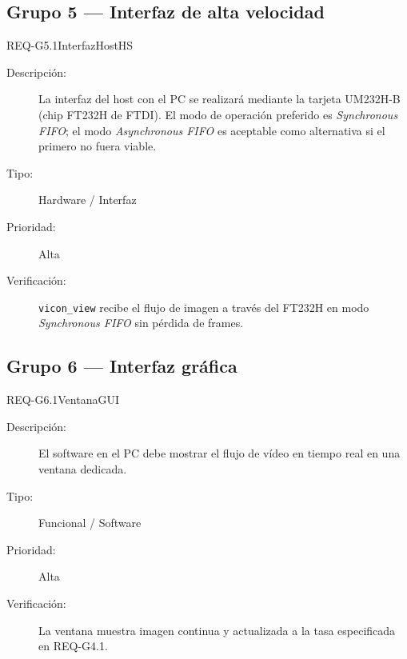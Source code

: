 \documentclass[../main.tex]{subfiles}
\begin{document}
\subsection{Grupo 5 — Interfaz de alta velocidad}

\begin{requisito}{REQ-G5.1}{InterfazHostHS}
\begin{description}
    \item[Descripción:]   La interfaz del host con el PC se realizará mediante la tarjeta UM232H-B (chip FT232H de FTDI). El modo de operación preferido es \textit{Synchronous FIFO}; el modo \textit{Asynchronous FIFO} es aceptable como alternativa si el primero no fuera viable.
    \item[Tipo:]          Hardware / Interfaz
    \item[Prioridad:]     Alta
    \item[Verificación:]  \texttt{vicon\_view} recibe el flujo de imagen a través del FT232H en modo \textit{Synchronous FIFO} sin pérdida de frames.
\end{description}
\end{requisito}

\subsection{Grupo 6 — Interfaz gráfica}

\begin{requisito}{REQ-G6.1}{VentanaGUI}
\begin{description}
    \item[Descripción:]   El software en el PC debe mostrar el flujo de vídeo en tiempo real en una ventana dedicada.
    \item[Tipo:]          Funcional / Software
    \item[Prioridad:]     Alta
    \item[Verificación:]  La ventana muestra imagen continua y actualizada a la tasa especificada en REQ-G4.1.
\end{description}
\end{requisito}
\end{document}
